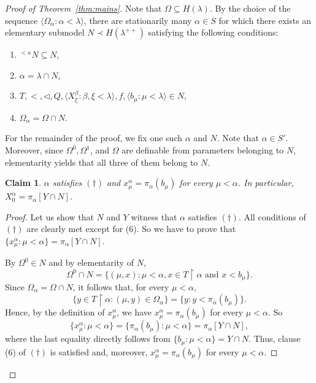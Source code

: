 \documentclass[]{amsart}
\newtheorem{claim}{Claim}[theorem]
\theoremstyle{definition}
\theoremstyle{remark}
\begin{document}
\begin{proof}[Proof of Theorem~\ref{thm:mains}]
Note that $\Omega \subseteq H(\lambda)$. By the choice of the sequence $\langle \Omega_\alpha : \alpha < \lambda\rangle$, there are stationarily many $\alpha \in S$ for which there exists an elementary submodel $N \prec H(\lambda^{++})$ satisfying the following conditions: 
\begin{enumerate}[label=(\alph*)]
\item ${}^{<\kappa}N \subseteq N$,
\item $\alpha = \lambda \cap N$,
\item $T, <, \lhd, Q, \langle X^\beta_\xi : \beta, \xi < \lambda\rangle, f, \langle b_\mu : \mu < \lambda\rangle\in N$,
\item $\Omega_\alpha = \Omega \cap N$.
\end{enumerate} 
For the remainder of the proof, we fix one such $\alpha$ and $N$. Note that $\alpha \in S'$. Moreover, since $\Omega^0, \Omega^1$, and $\Omega$ are definable from parameters belonging to $N$, elementarity yields that all three of them belong to $N$.
\pagebreak
\begin{claim}\label{claim:10}
$\alpha$ satisfies $(\dagger)$ and $x^\alpha_\mu = \pi_\alpha(b_\mu)$ for every $\mu < \alpha$. In particular, $X^\alpha_0 = \pi_\alpha[Y \cap N]$.
\end{claim}
\begin{proof}
Let us show that $N$ and $Y$ witness that $\alpha$ satisfies $(\dagger)$. All conditions of $(\dagger)$ are clearly met except for (6). So we have to prove that $\{x^\alpha_\mu : \mu < \alpha\} = \pi_\alpha[Y \cap N]$. 


By $\Omega^0 \in N$ and by elementarity of $N$,
\[
\Omega^0 \cap N = \{(\mu, x) : \mu < \alpha, x \in T \upharpoonright \alpha \text{ and } x < b_\mu\}.
\]
Since $\Omega_\alpha = \Omega \cap N$, it follows that, for every $\mu < \alpha$,
\[
\{y \in T \upharpoonright \alpha : (\mu, y) \in \Omega_\alpha\} = \{y : y < \pi_\alpha(b_\mu)\}.
\]
Hence, by the definition of $x^\alpha_\mu$, we have $x^\alpha_\mu = \pi_\alpha(b_\mu)$ for every $\mu < \alpha$. So 
\begin{equation}\label{eq:dagger}
\{x^\alpha_\mu : \mu < \alpha\} = \{\pi_\alpha(b_\mu) : \mu < \alpha\} = \pi_\alpha[Y \cap N],
\end{equation}
where the last equality directly follows from $\{b_\mu : \mu < \alpha\} = Y \cap N$.  Thus, clause (6) of $(\dagger)$ is satisfied and, moreover, $x^\alpha_\mu = \pi_\alpha(b_\mu)$ for every $\mu < \alpha$.
\end{proof}


\end{proof}
\end{document}
